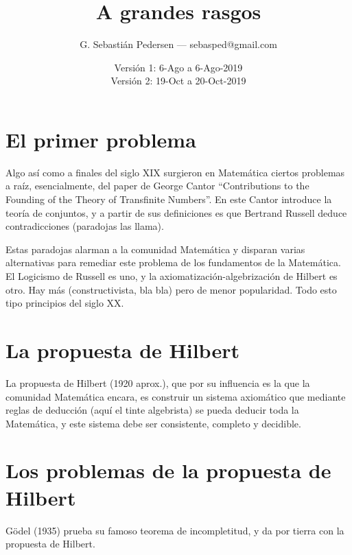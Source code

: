 \documentclass[a4paper,11pt]{article}
\title{A grandes rasgos}
\author{G. Sebastián Pedersen --- sebasped@gmail.com}
\date{Versión 1: 6-Ago a 6-Ago-2019\\
Versión 2: 19-Oct a 20-Oct-2019}
\begin{document}
\maketitle


\section{El primer problema}
Algo así como a finales del siglo XIX surgieron en Matemática ciertos problemas a raíz, esencialmente, del paper de George Cantor ``Contributions to the Founding of the Theory of Transfinite Numbers''. En este Cantor introduce la teoría de conjuntos, y a partir de sus definiciones es que Bertrand Russell deduce contradicciones (paradojas las llama).

Estas paradojas alarman a la comunidad Matemática y disparan varias alternativas para remediar este problema de los fundamentos de la Matemática. El Logicismo de Russell es uno, y la axiomatización-algebrización de Hilbert es otro. Hay más (constructivista, bla bla) pero de menor popularidad. Todo esto tipo principios del siglo XX.

\section{La propuesta de Hilbert}
La propuesta de Hilbert (1920 aprox.), que por su influencia es la que la comunidad Matemática encara, es construir un sistema axiomático que mediante reglas de deducción (aquí el tinte algebrista) se pueda deducir toda la Matemática, y este sistema debe ser consistente, completo y decidible.

\section{Los problemas de la propuesta de Hilbert}
Gödel (1935) prueba su famoso teorema de incompletitud, y da por tierra con la propuesta de Hilbert.
\end{document}
